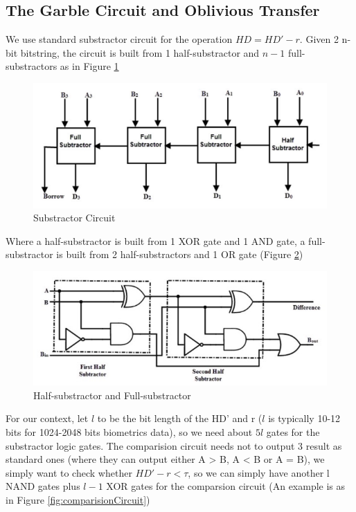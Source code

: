 \subsection{The Garble Circuit and Oblivious Transfer}
We use standard substractor circuit for the operation \(HD = HD' - r\). Given 2
n-bit bitstring, the circuit is built from 1 half-substractor and \(n-1\)
full-substractors as in Figure \ref{fig:substractor}

\begin{figure}[htbp!] 
  \centering    
  \includegraphics[width=1.0\textwidth]{Chapter6/Figs/Raster/subCircuit}
  \caption{Substractor Circuit}
  \label{fig:substractor}
\end{figure}

Where a half-substractor is built from 1 XOR gate and 1 AND gate, a full-substractor is built from 2 half-substractors and 1 OR gate (Figure \ref{fig:fullSubstractor})

\begin{figure}[htbp!] 
  \centering    
  \includegraphics[width=1.0\textwidth]{Chapter6/Figs/Raster/fullSubstractor}
  \caption{Half-substractor and Full-substractor}
  \label{fig:fullSubstractor}
\end{figure}

For our context, let \(l\) to be the bit length of the HD' and r (\(l\) is
typically 10-12 bits for 1024-2048 bits biometrics data), so we need about
\(5l\) gates for the substractor logic gates. The comparision circuit needs not
to output 3 result as standard ones (where they can output either A > B, A < B
or A = B), we simply want to check whether \(HD' - r < \tau\), so we can simply
have another l NAND gates plus \(l-1\) XOR gates for the comparsion circuit (An
example is as in Figure \ref{fig:comparisionCircuit})

